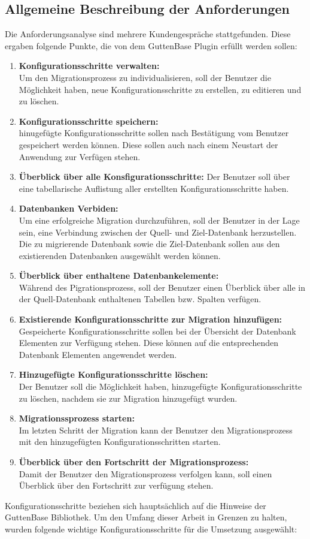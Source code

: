 \subsection{Allgemeine Beschreibung der Anforderungen}
Die Anforderungsanalyse sind mehrere Kundengespräche stattgefunden. Diese ergaben folgende Punkte, die von dem GuttenBase Plugin erfüllt werden sollen:
\begin{enumerate}
	\item \textbf{Konfigurationsschritte verwalten:}\\
	Um den Migrationsprozess zu individualisieren, soll der Benutzer die Möglichkeit haben, neue Konfigurationsschritte zu erstellen, zu editieren und zu löschen.
	\item \textbf{Konfigurationsschritte speichern:} \\
	hinugefügte Konfigurationsschritte sollen nach Bestätigung vom Benutzer gespeichert werden können. Diese sollen auch nach einem Neustart der Anwendung zur Verfügen stehen.
	\item \textbf{Überblick über alle Konsfigurationsschritte:}
	Der Benutzer soll über eine tabellarische Auflistung aller erstellten Konfigurationsschritte haben.
	\item \textbf{Datenbanken Verbiden:} \\
	Um eine erfolgreiche Migration durchzuführen, soll der Benutzer in der Lage sein, eine Verbindung zwischen der Quell- und Ziel-Datenbank herzustellen. Die zu migrierende Datenbank sowie die Ziel-Datenbank sollen aus den existierenden Datenbanken ausgewählt werden können.
	\item \textbf{Überblick über enthaltene Datenbankelemente:}\\
	Während des Pigrationsprozess, soll der Benutzer einen Überblick über alle in der Quell-Datenbank enthaltenen Tabellen bzw. Spalten verfügen.
	\item \textbf{Existierende Konfigurationsschritte zur Migration hinzufügen:}\\
	Gespeicherte Konfigurationsschritte sollen bei der Übersicht der Datenbank Elementen zur Verfügung stehen. Diese können auf die entsprechenden Datenbank Elementen angewendet werden.
	\item \textbf{Hinzugefügte Konfigurationsschritte löschen:}\\	
	Der Benutzer soll die Möglichkeit haben, hinzugefügte Konfigurationsschritte zu löschen, nachdem sie zur Migration hinzugefügt wurden.
	\item \textbf{Migrationssprozess starten:} \\
	Im letzten Schritt der Migration kann der Benutzer den Migrationsprozess mit den hinzugefügten Konfigurationsschritten starten.	
	\item \textbf{Überblick über den Fortschritt der Migrationsprozess:}\\
	Damit der Benutzer den Migrationsprozess verfolgen kann, soll einen Überblick über den Fortschritt zur verfügung stehen. 
\end{enumerate}
Konfigurationsschritte beziehen sich hauptsächlich auf die Hinweise der GuttenBase Bibliothek. Um den Umfang dieser Arbeit in Grenzen zu halten, wurden folgende wichtige Konfigurationsschritte für die Umsetzung ausgewählt:

